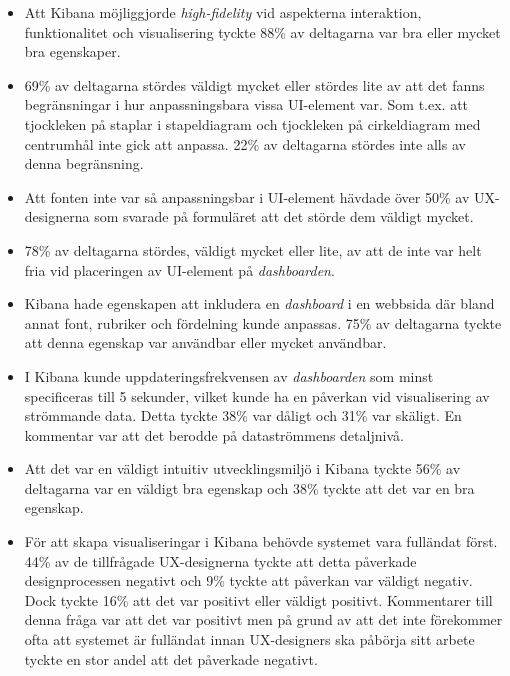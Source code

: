 \documentclass[12pt]{kththesis}
\begin{document}
\begin{itemize}
\item Att Kibana möjliggjorde \textit{high-fidelity} vid aspekterna interaktion, funktionalitet och visualisering tyckte 88\% av deltagarna var bra eller mycket bra egenskaper.

\item 69\% av deltagarna stördes väldigt mycket eller stördes lite av att det fanns begränsningar i hur anpassningsbara vissa UI-element var. Som t.ex. att tjockleken på staplar i stapeldiagram och tjockleken på cirkeldiagram med centrumhål inte gick att anpassa. 22\% av deltagarna stördes inte alls av denna begränsning.

\item Att fonten inte var så anpassningsbar i UI-element hävdade över 50\% av UX-designerna som svarade på formuläret att det störde dem väldigt mycket.

\item 78\% av deltagarna stördes, väldigt mycket eller lite, av att de inte var helt fria vid placeringen av UI-element på \textit{dashboarden}. 

\item Kibana hade egenskapen att inkludera en \textit{dashboard} i en webbsida där bland annat font, rubriker och fördelning kunde anpassas. 75\% av deltagarna tyckte att denna egenskap var användbar eller mycket användbar.

\item I Kibana kunde uppdateringsfrekvensen av \textit{dashboarden} som minst specificeras till 5 sekunder, vilket kunde ha en påverkan vid visualisering av strömmande data. Detta tyckte 38\% var dåligt och 31\% var skäligt. En kommentar var att det berodde på dataströmmens detaljnivå.

\item Att det var en väldigt intuitiv utvecklingsmiljö i Kibana tyckte 56\% av deltagarna var en väldigt bra egenskap och 38\% tyckte att det var en bra egenskap.

\item För att skapa visualiseringar i Kibana behövde systemet vara fulländat först. 44\% av de tillfrågade UX-designerna tyckte att detta påverkade designprocessen negativt och 9\% tyckte att påverkan var väldigt negativ. Dock tyckte 16\% att det var positivt eller väldigt positivt. Kommentarer till denna fråga var att det var positivt men på grund av att det inte förekommer ofta att systemet är fulländat innan UX-designers ska påbörja sitt arbete tyckte en stor andel att det påverkade negativt.


\end{itemize}
\end{document}
